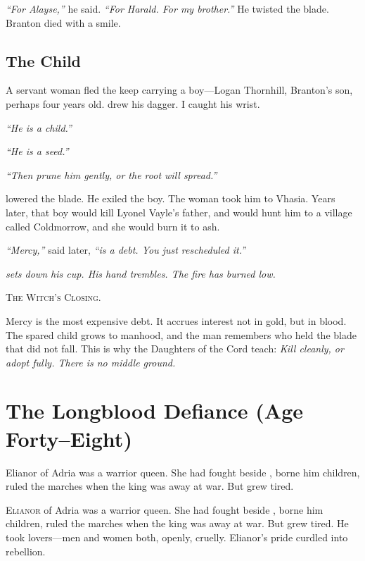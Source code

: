 \documentclass[11pt,a5paper]{book}
\newenvironment{witchclosing}
  {\begin{quoting}[font={small\itshape}, leftmargin=2em, rightmargin=2em]\noindent\textsc{The Witch's Closing.}\par}
  {\end{quoting}}
\begin{document}
\textit{``For Alayse,''} he said. \textit{``For Harald. For my brother.''} He twisted the blade. Branton died with a smile.

\section*{The Child}
A servant woman fled the keep carrying a boy---Logan Thornhill, Branton's son, perhaps four years old. \baldvyn{} drew his dagger. I caught his wrist.

\textit{``He is a child.''}

\textit{``He is a seed.''}

\textit{``Then prune him gently, or the root will spread.''}

\baldvyn{} lowered the blade. He exiled the boy. The woman took him to Vhasia. Years later, that boy would kill Lyonel Vayle's father, and \veralyn{} would hunt him to a village called Coldmorrow, and she would burn it to ash.

\textit{``Mercy,''} \baldvyn{} said later, \textit{``is a debt. You just rescheduled it.''}

\vspace{1em}
\noindent\textit{\braedon{} sets down his cup. His hand trembles. The fire has burned low.}

\begin{witchclosing}
Mercy is the most expensive debt. It accrues interest not in gold, but in blood. The spared child grows to manhood, and the man remembers who held the blade that did not fall. This is why the Daughters of the Cord teach: \textit{Kill cleanly, or adopt fully. There is no middle ground.}
\end{witchclosing}

\clearpage

\chapter{The Longblood Defiance (Age Forty--Eight)}

\epigraph{Elianor of Adria was a warrior queen. She had fought beside \baldvyn, borne him children, ruled the marches when the king was away at war. But \baldvyn{} grew tired.}{\braedon}

\lettrine{E}{lianor} of Adria was a warrior queen. She had fought beside \baldvyn, borne him children, ruled the marches when the king was away at war. But \baldvyn{} grew tired. He took lovers---men and women both, openly, cruelly. Elianor's pride curdled into rebellion.
\end{document}

